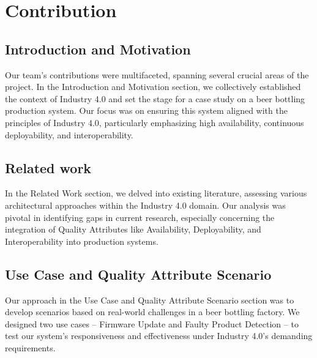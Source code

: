 \documentclass[conference]{IEEEtran}
\begin{document}


\maketitle
\IEEEpubidadjcol


\section{Contribution}
\subsection{Introduction and Motivation}
Our team's contributions were multifaceted, spanning several crucial areas of the project. In the Introduction and Motivation section, we collectively established the context of Industry 4.0 and set the stage for a case study on a beer bottling production system. Our focus was on ensuring this system aligned with the principles of Industry 4.0, particularly emphasizing high availability, continuous deployability, and interoperability.

\subsection{Related work}
In the Related Work section, we delved into existing literature, assessing various architectural approaches within the Industry 4.0 domain. Our analysis was pivotal in identifying gaps in current research, especially concerning the integration of Quality Attributes like Availability, Deployability, and Interoperability into production systems.

\subsection{Use Case and Quality Attribute Scenario}
Our approach in the Use Case and Quality Attribute Scenario section was to develop scenarios based on real-world challenges in a beer bottling factory. We designed two use cases – Firmware Update and Faulty Product Detection – to test our system's responsiveness and effectiveness under Industry 4.0's demanding requirements.
\end{document}
